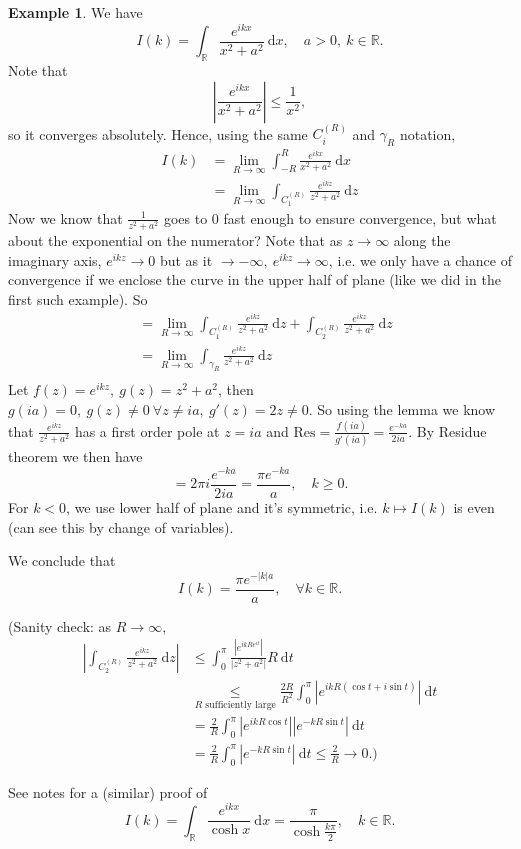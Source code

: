 \documentclass[a4paper]{article}
\theoremstyle{definition}
\newtheorem{example}[defn]{Example}
\begin{document}
\begin{example}
We have
\[
I(k) = \int_{\mathbb R} \frac{e^{ikx}}{x^2+a^2} \ \mathrm d x, \quad a>0,\ k\in \mathbb R.
\]
Note that
\[
\left|\frac{e^{ikx}}{x^2+a^2}\right| \leq \frac{1}{x^2},
\]
so it converges absolutely. Hence, using the same $C_i^{(R)}$ and $\gamma_R$ notation, 
\[
\begin{aligned}
I(k) &= \lim_{R\rightarrow \infty} \int_{-R}^R \frac{e^{ikx}}{x^2+a^2} \ \mathrm d x \\
&=\lim_{R\rightarrow \infty} \int_{C_1^{(R)}} \frac{e^{ikz}}{z^2+a^2} \ \mathrm d z
\end{aligned}
\]
Now we know that $\frac{1}{z^2+a^2}$ goes to 0 fast enough to ensure convergence, but what about the exponential on the numerator? Note that as $z \rightarrow \infty$ along the imaginary axis, $e^{ikz}\rightarrow 0$ but as it $\rightarrow -\infty,\ e^{ikz} \rightarrow \infty$, i.e. we only have a chance of convergence if we enclose the curve in the upper half of plane (like we did in the first such example). So
\[
\begin{aligned}
&= \lim_{R\rightarrow \infty }\int_{C_1^{(R)}} \frac{e^{ikz}}{z^2+a^2} \ \mathrm d z+\int_{C_2^{(R)}} \frac{e^{ikz}}{z^2+a^2} \ \mathrm d z \\
&=\lim_{R\rightarrow \infty} \int_{\gamma_R} \frac{e^{ikz}}{z^2+a^2} \ \mathrm d z \\
\end{aligned}
\]
Let $f(z)=e^{ikz},\ g(z)=z^2+a^2$, then $g(ia)=0,\ g(z) \neq 0 \ \forall z\neq ia,\ g'(z)=2z\neq 0$. So using the lemma we know that $\frac{e^{ikz}}{z^2+a^2}$ has a first order pole at $z=ia$ and $\text{Res} =\frac{f(ia)}{g'(ia)}=\frac{e^{-ka}}{2ia}$. By Residue theorem we then have
\[
=2\pi i \frac{e^{-ka}}{2ia} = \frac{\pi e^{-ka}}{a}, \quad k\geq 0.
\]
For $k<0$, we use lower half of plane and it's symmetric, i.e. $k\mapsto I(k)$ is even (can see this by change of variables).

We conclude that
\[
I(k)=\frac{\pi e^{-|k|a}}{a},\quad \forall k\in \mathbb R.
\]

(Sanity check: as $R\rightarrow \infty$,
\[
\begin{aligned}
\left| \int_{C_2^{(R)}} \frac{e^{ikz}}{z^2+a^2} \ \mathrm d z\right| &\leq \int_0^\pi \frac{\left|e^{ikRe^{it}}\right|}{|z^2+a^2|} R \ \mathrm d t \\&\underset{R\text{ sufficiently large}}{\leq} \frac{2R}{R^2} \int_0^\pi \left|e^{ikR(\cos t+i\sin t)}\right|\ \mathrm d t \\
&= \frac{2}{R} \int_0^\pi \left| e^{ikR\cos t}\right| \left| e^{-kR\sin t}\right| \ \mathrm d t \\
&= \frac{2}{R} \int_0^\pi \left| e^{-kR\sin t}\right| \ \mathrm d t \leq \frac{2}{R} \rightarrow 0.)
\end{aligned}
\]
\end{example}

See notes for a (similar) proof of
\[
I(k) = \int_{\mathbb R} \frac{e^{ikx}}{\cosh x} \ \mathrm d x = \frac{\pi}{\cosh \frac{k\pi}{2}},\quad k\in \mathbb R.
\]
\end{document}

